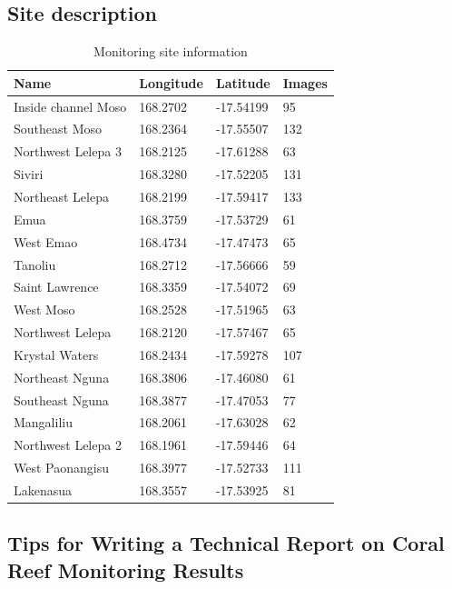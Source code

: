 \documentclass[
  letterpaper,
  DIV=11,
  numbers=noendperiod]{scrartcl}
\begin{document}
\subsection{Site description}\label{site-description}

\begin{longtable}[]{@{}llll@{}}

\caption{\label{tbl-surveyed_sites}Monitoring site information}

\tabularnewline

\toprule\noalign{}
Name & Longitude & Latitude & Images \\
\midrule\noalign{}
\endhead
\bottomrule\noalign{}
\endlastfoot
Inside channel Moso & 168.2702 & -17.54199 & 95 \\
Southeast Moso & 168.2364 & -17.55507 & 132 \\
Northwest Lelepa 3 & 168.2125 & -17.61288 & 63 \\
Siviri & 168.3280 & -17.52205 & 131 \\
Northeast Lelepa & 168.2199 & -17.59417 & 133 \\
Emua & 168.3759 & -17.53729 & 61 \\
West Emao & 168.4734 & -17.47473 & 65 \\
Tanoliu & 168.2712 & -17.56666 & 59 \\
Saint Lawrence & 168.3359 & -17.54072 & 69 \\
West Moso & 168.2528 & -17.51965 & 63 \\
Northwest Lelepa & 168.2120 & -17.57467 & 65 \\
Krystal Waters & 168.2434 & -17.59278 & 107 \\
Northeast Nguna & 168.3806 & -17.46080 & 61 \\
Southeast Nguna & 168.3877 & -17.47053 & 77 \\
Mangaliliu & 168.2061 & -17.63028 & 62 \\
Northwest Lelepa 2 & 168.1961 & -17.59446 & 64 \\
West Paonangisu & 168.3977 & -17.52733 & 111 \\
Lakenasua & 168.3557 & -17.53925 & 81 \\

\end{longtable}

\pagebreak

\subsection{Tips for Writing a Technical Report on Coral Reef Monitoring
Results}\label{tips-for-writing-a-technical-report-on-coral-reef-monitoring-results}
\end{document}
